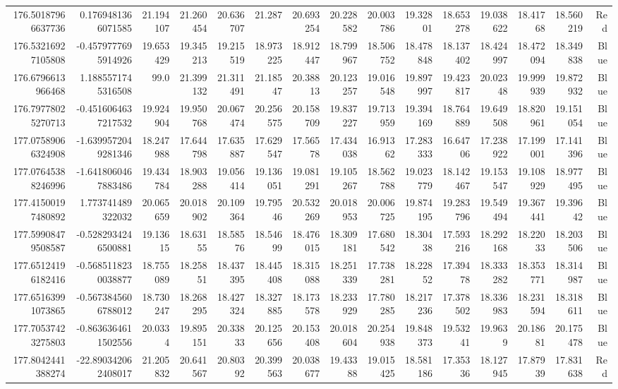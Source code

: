 \begin{center}
\begin{longtable}{rrrrrrrrrrrrrrr}
176.50187966637736 & 0.1769481366071585 & 21.194107 & 21.260454 & 20.636707 & 21.287 & 20.693254 & 20.228582 & 20.003786 & 19.32801 & 18.653278 & 19.038622 & 18.41768 & 18.560219 & Red \\
176.53216927105808 & -0.4579777695914926 & 19.653429 & 19.345213 & 19.215519 & 18.973225 & 18.912447 & 18.799967 & 18.506752 & 18.478848 & 18.137402 & 18.424997 & 18.472094 & 18.349838 & Blue \\
176.6796613966468 & 1.1885571745316508 & 99.0 & 21.399132 & 21.311491 & 21.18547 & 20.38813 & 20.123257 & 19.016548 & 19.897997 & 19.423817 & 20.02348 & 19.999939 & 19.872932 & Blue \\
176.79778025270713 & -0.4516064637217532 & 19.924904 & 19.950768 & 20.067474 & 20.256575 & 20.158709 & 19.837227 & 19.713959 & 19.394169 & 18.764889 & 19.649508 & 18.820961 & 19.151054 & Blue \\
177.07589066324908 & -1.6399572049281346 & 18.247988 & 17.644798 & 17.635887 & 17.629547 & 17.56578 & 17.434038 & 16.91362 & 17.283333 & 16.64706 & 17.238922 & 17.199001 & 17.141396 & Blue \\
177.07645388246996 & -1.6418060467883486 & 19.434784 & 18.903288 & 19.056414 & 19.136051 & 19.081291 & 19.105267 & 18.562788 & 19.023779 & 18.142467 & 19.153547 & 19.108929 & 18.977495 & Blue \\
177.41500197480892 & 1.773741489322032 & 20.065659 & 20.018902 & 20.109364 & 19.79546 & 20.532269 & 20.018953 & 20.006725 & 19.874195 & 19.283796 & 19.549494 & 19.367441 & 19.39642 & Blue \\
177.59908479508587 & -0.5282934246500881 & 19.13615 & 18.63155 & 18.58576 & 18.54699 & 18.476015 & 18.309181 & 17.680542 & 18.30438 & 17.593216 & 18.292168 & 18.22033 & 18.203506 & Blue \\
177.65124196182416 & -0.5685118230038877 & 18.755089 & 18.25851 & 18.437395 & 18.445408 & 18.315088 & 18.251339 & 17.738281 & 18.22852 & 17.39478 & 18.333282 & 18.353771 & 18.314987 & Blue \\
177.65163991073865 & -0.5673845606788012 & 18.730247 & 18.268295 & 18.427324 & 18.327885 & 18.173578 & 18.233929 & 17.780285 & 18.217236 & 17.378502 & 18.336983 & 18.231594 & 18.318611 & Blue \\
177.70537423275803 & -0.8636364611502556 & 20.0334 & 19.895151 & 20.33833 & 20.125656 & 20.153408 & 20.018604 & 20.254938 & 19.848373 & 19.53241 & 19.9639 & 20.18681 & 20.175478 & Blue \\
177.8042441388274 & -22.890342062408017 & 21.205832 & 20.641567 & 20.80392 & 20.399563 & 20.038677 & 19.43388 & 19.015425 & 18.581186 & 17.35336 & 18.127945 & 17.87939 & 17.831638 & Red \\

\end{longtable}
\end{center}
